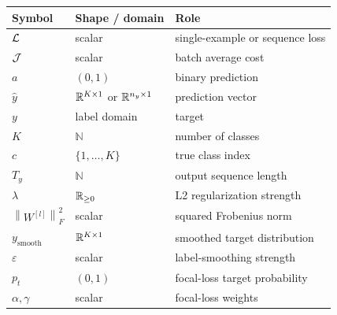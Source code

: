 \begin{center}
\begin{tabular}{lll}
\toprule
Symbol & Shape / domain & Role \\
\midrule
$\mathcal{L}$ & scalar & single-example or sequence loss \\
$\mathcal{J}$ & scalar & batch average cost \\
$a$ & $(0,1)$ & binary prediction \\
$\hat{y}$ & $\mathbb{R}^{K \times 1}$ or $\mathbb{R}^{n_y \times 1}$ & prediction vector \\
$y$ & label domain & target \\
$K$ & $\mathbb{N}$ & number of classes \\
$c$ & $\{1,\dots,K\}$ & true class index \\
$T_y$ & $\mathbb{N}$ & output sequence length \\
$\lambda$ & $\mathbb{R}_{\ge 0}$ & L2 regularization strength \\
$\left\lVert W^{[l]} \right\rVert_F^2$ & scalar & squared Frobenius norm \\
$y_{\mathrm{smooth}}$ & $\mathbb{R}^{K \times 1}$ & smoothed target distribution \\
$\varepsilon$ & scalar & label-smoothing strength \\
$p_t$ & $(0,1)$ & focal-loss target probability \\
$\alpha,\gamma$ & scalar & focal-loss weights \\
\bottomrule
\end{tabular}
\end{center}
